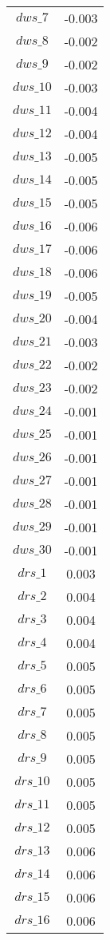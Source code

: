 \begin{center}
\begin{longtable}{cc}
$dws\_7$ 	 & 	 -0.003 \\
$dws\_8$ 	 & 	 -0.002 \\
$dws\_9$ 	 & 	 -0.002 \\
$dws\_10$ 	 & 	 -0.003 \\
$dws\_11$ 	 & 	 -0.004 \\
$dws\_12$ 	 & 	 -0.004 \\
$dws\_13$ 	 & 	 -0.005 \\
$dws\_14$ 	 & 	 -0.005 \\
$dws\_15$ 	 & 	 -0.005 \\
$dws\_16$ 	 & 	 -0.006 \\
$dws\_17$ 	 & 	 -0.006 \\
$dws\_18$ 	 & 	 -0.006 \\
$dws\_19$ 	 & 	 -0.005 \\
$dws\_20$ 	 & 	 -0.004 \\
$dws\_21$ 	 & 	 -0.003 \\
$dws\_22$ 	 & 	 -0.002 \\
$dws\_23$ 	 & 	 -0.002 \\
$dws\_24$ 	 & 	 -0.001 \\
$dws\_25$ 	 & 	 -0.001 \\
$dws\_26$ 	 & 	 -0.001 \\
$dws\_27$ 	 & 	 -0.001 \\
$dws\_28$ 	 & 	 -0.001 \\
$dws\_29$ 	 & 	 -0.001 \\
$dws\_30$ 	 & 	 -0.001 \\
$drs\_1$ 	 & 	 0.003 \\
$drs\_2$ 	 & 	 0.004 \\
$drs\_3$ 	 & 	 0.004 \\
$drs\_4$ 	 & 	 0.004 \\
$drs\_5$ 	 & 	 0.005 \\
$drs\_6$ 	 & 	 0.005 \\
$drs\_7$ 	 & 	 0.005 \\
$drs\_8$ 	 & 	 0.005 \\
$drs\_9$ 	 & 	 0.005 \\
$drs\_10$ 	 & 	 0.005 \\
$drs\_11$ 	 & 	 0.005 \\
$drs\_12$ 	 & 	 0.005 \\
$drs\_13$ 	 & 	 0.006 \\
$drs\_14$ 	 & 	 0.006 \\
$drs\_15$ 	 & 	 0.006 \\
$drs\_16$ 	 & 	 0.006 \\

\end{longtable}
\end{center}
